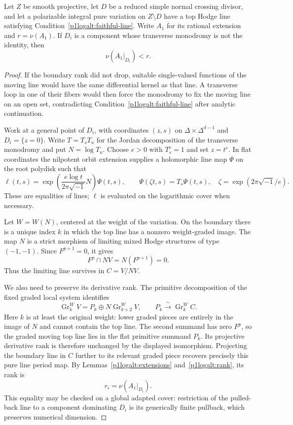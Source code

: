 \begin{lemma}\label{p1logalt:boundary-drop}
Let $Z$ be smooth projective, let $D$ be a reduced simple normal crossing
divisor, and let a polarizable integral pure variation on $Z\setminus D$
have a top Hodge line satisfying Condition~\eqref{p1logalt:faithful-line}.  Write $A_1$
for its rational extension and $r=\nu(A_1)$.  If $D_i$ is a component
whose transverse monodromy is not the identity, then
\[
 \nu(A_1|_{D_i})<r.
\]
\end{lemma}

\begin{proof}
If the boundary rank did not drop, suitable single-valued functions of
the moving line would have the same differential kernel as that line.
A transverse loop in one of their fibers would then force the monodromy
to fix the moving line on an open set, contradicting
Condition~\eqref{p1logalt:faithful-line} after analytic continuation.

Work at a general point of $D_i$, with coordinates $(z,s)$ on
$\Delta\times\Delta^{d-1}$ and $D_i=\{z=0\}$.  Write
$T=T_sT_u$ for the Jordan decomposition of the transverse monodromy and
put $N=\log T_u$.  Choose $e>0$ with $T_s^e=1$ and set $z=t^e$.
In flat coordinates the nilpotent orbit extension supplies a holomorphic
line map $\Psi$ on the root polydisk such that
\begin{equation}\label{p1logalt:untwist}
 \ell(t,s)=
 \exp\left(\frac{e\log t}{2\pi\sqrt{-1}}N\right)\Psi(t,s),
 \qquad
 \Psi(\zeta t,s)=T_s\Psi(t,s),
 \quad \zeta=\exp(2\pi\sqrt{-1}/e).
\end{equation}
These are equalities of lines; $\ell$ is evaluated on the logarithmic
cover when necessary.

Let $W=W(N)$, centered at the weight of the variation.  On the boundary
there is a unique index $k$ in which the top line has a nonzero
weight-graded image.  The map $N$ is a strict morphism of limiting mixed
Hodge structures of type $(-1,-1)$.  Since $F^{p+1}=0$, it gives
\begin{equation}\label{p1logalt:survives}
 F^p\cap NV=N(F^{p+1})=0.
\end{equation}
Thus the limiting line survives in $C=V/NV$.

We also need to preserve its derivative rank.  The primitive decomposition
of the fixed graded local system identifies
\[
 \operatorname{Gr}^W_k V
 =P_k\oplus N\operatorname{Gr}^W_{k+2}V,
 \qquad
 P_k\xrightarrow{\ \sim\ }\operatorname{Gr}^W_k C.
\]
Here $k$ is at least the original weight: lower graded pieces are
entirely in the image of $N$ and cannot contain the top line.  The second
summand has zero $F^p$, so the graded moving top line lies in the flat
primitive summand $P_k$.  Its projective derivative rank is therefore
unchanged by the displayed isomorphism.  Projecting the boundary line
in $C$ further to its relevant graded piece recovers precisely this pure
line period map.  By Lemmas~\ref{p1logalt:extensions} and~\ref{p1logalt:rank},
its rank is
\[
 r_i=\nu(A_1|_{D_i}).
\]
This equality may be checked on a global adapted cover: restriction of
the pulled-back line to a component dominating $D_i$ is its generically
finite pullback, which preserves numerical dimension.


\end{proof}
